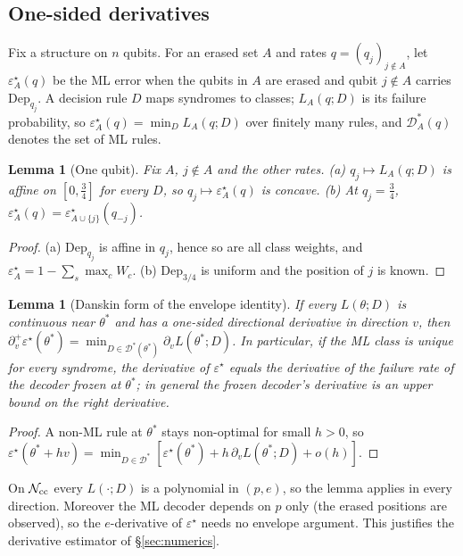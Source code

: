 \documentclass[11pt,a4paper]{article}
\theoremstyle{plain}
\newtheorem{lemma}[theorem]{Lemma}
\theoremstyle{definition}
\theoremstyle{remark}
\newcommand{\err}{\varepsilon^{\star}}
\newcommand{\Dep}{\mathrm{Dep}}
\newcommand{\Ncc}{\mathcal{N}_{\rm cc}}
\begin{document}
\subsection{One-sided derivatives}

Fix a structure on $n$ qubits. For an erased set $A$ and rates $q=(q_j)_{j\notin A}$, let $\err_A(q)$ be the ML error when the qubits in $A$ are erased and qubit $j\notin A$ carries $\Dep_{q_j}$. A decision rule $D$ maps syndromes to classes; $L_A(q;D)$ is its failure probability, so $\err_A(q)=\min_DL_A(q;D)$ over finitely many rules, and $\mathcal D^\ast_A(q)$ denotes the set of ML rules.

\begin{lemma}[One qubit]\label{lem:concave}
Fix $A$, $j\notin A$ and the other rates. (a) $q_j\mapsto L_A(q;D)$ is affine on $[0,\tfrac34]$ for every $D$, so $q_j\mapsto\err_A(q)$ is concave. (b) At $q_j=\tfrac34$, $\err_A(q)=\err_{A\cup\{j\}}(q_{-j})$.
\end{lemma}
\begin{proof}
(a) $\Dep_{q_j}$ is affine in $q_j$, hence so are all class weights, and $\err_A=1-\sum_s\max_cW_c$. (b) $\Dep_{3/4}$ is uniform and the position of $j$ is known.
\end{proof}

\begin{lemma}[Danskin form of the envelope identity]\label{lem:danskin}
If every $L(\theta;D)$ is continuous near $\theta^\ast$ and has a one-sided directional derivative in direction $v$, then $\partial^+_v\err(\theta^\ast)=\min_{D\in\mathcal D^\ast(\theta^\ast)}\partial_vL(\theta^\ast;D)$. In particular, if the ML class is unique for every syndrome, the derivative of $\err$ equals the derivative of the failure rate of the decoder frozen at $\theta^\ast$; in general the frozen decoder's derivative is an upper bound on the right derivative.
\end{lemma}
\begin{proof}
A non-ML rule at $\theta^\ast$ stays non-optimal for small $h>0$, so $\err(\theta^\ast+hv)=\min_{D\in\mathcal D^\ast}[\err(\theta^\ast)+h\,\partial_vL(\theta^\ast;D)+o(h)]$.
\end{proof}

\noindent On $\Ncc$ every $L(\cdot;D)$ is a polynomial in $(p,e)$, so the lemma applies in every direction. Moreover the ML decoder depends on $p$ only (the erased positions are observed), so the $e$-derivative of $\err$ needs no envelope argument. This justifies the derivative estimator of \S\ref{sec:numerics}.
\end{document}
